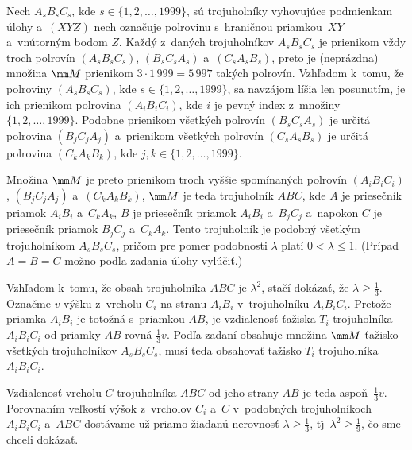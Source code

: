 {%
Nech $A_sB_sC_s$, kde  $s\in \{1,2,\dots ,1999\}$, sú
trojuholníky vyhovujúce podmienkam úlohy
a~$(XYZ)$ nech označuje polrovinu s~hraničnou priamkou~$XY$ a~vnútorným
bodom $Z$. Každý z~daných trojuholníkov $A_sB_sC_s$ je prienikom vždy
troch polrovín $(A_sB_sC_s)$, $(B_sC_sA_s)$ a~$(C_sA_sB_s)$, preto je
(neprázdna)
množina $\mm M$ prienikom $3\cdot1\,999=5\,997$ takých polrovín. Vzhľadom
k~tomu, že polroviny $(A_sB_sC_s)$, kde $s\in \{1,2,\dots ,1999\}$, sa
navzájom líšia len posunutím, je ich prienikom polrovina $(A_iB_iC_i)$,
kde $i$ je pevný index z~množiny $\{1,2,\dots ,1999\}$. Podobne prienikom
všetkých polrovín $(B_sC_sA_s)$ je určitá polrovina $(B_jC_jA_j)$
a~prienikom všetkých polrovín $(C_sA_sB_s)$ je určitá polrovina
$(C_kA_kB_k)$, kde $j,k\in \{1,2,\dots ,1999\}$.

Množina $\mm M$ je preto prienikom troch vyššie
spomínaných polrovín $(A_iB_iC_i)$,
$(B_jC_jA_j)$ a~$(C_kA_kB_k)$, $\mm M$ je teda trojuholník $ABC$,
kde $A$ je priesečník priamok $A_iB_i$ a~$C_kA_k$, $B$ je priesečník priamok
$A_iB_i$ a~$B_jC_j$ a~napokon $C$ je priesečník priamok $B_jC_j$ a~$C_kA_k$.
Tento trojuholník je podobný všetkým trojuholníkom $A_sB_sC_s$, pričom pre
pomer podobnosti $\lambda$ platí $0<\lambda \leq 1$. (Prípad $A=B=C$ možno
podľa zadania úlohy vylúčiť.)

Vzhľadom k~tomu, že obsah trojuholníka $ABC$ je $\lambda^2$, stačí
dokázať, že $\lambda \geq \frac13$. Označme $v$ výšku z~vrcholu
$C_i$ na stranu $A_iB_i$ v~trojuholníku $A_iB_iC_i$. Pretože priamka
$A_iB_i$ je totožná s~priamkou $AB$, je vzdialenosť ťažiska $T_i$
trojuholníka $A_iB_iC_i$ od priam\-ky $AB$ rovná $\frac13v$. Podľa zadaní
obsahuje množina $\mm M$ ťažisko všetkých trojuholníkov $A_sB_sC_s$, musí
teda obsahovať ťažisko $T_i$ trojuholníka $A_iB_iC_i$.

Vzdialenosť vrcholu $C$ trojuholníka $ABC$ od jeho strany $AB$ je teda
aspoň~$\frac13v$. Porovnaním veľkostí výšok z~vrcholov $C_i$ a~$C$
v~podobných trojuholníkoch $A_iB_iC_i$ a~$ABC$ dostávame už priamo
žiadanú
nerovnosť $\lambda \geq \frac13$, t\.j\.~$\lambda^2 \geq \frac19$, čo sme
chceli dokázať.
}

